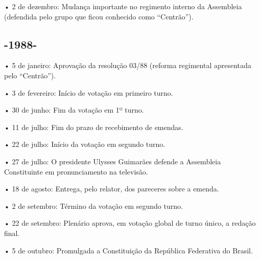 • 2 de dezembro: Mudança importante no regimento interno da Assembleia
(defendida pelo grupo que ficou conhecido como ``Centrão'').

\subsection{-1988-}

\forceindent{}• 5 de janeiro: Aprovação da resolução 03/88 (reforma regimental
apresentada pelo ``Centrão'').

• 3 de fevereiro: Início de votação em primeiro turno.

• 30 de junho: Fim da votação em 1º turno.

• 11 de julho: Fim do prazo de recebimento de emendas.

• 22 de julho: Início da votação em segundo turno.

• 27 de julho: O presidente Ulysses Guimarães defende a Assembleia
Constituinte em pronunciamento na televisão.

• 18 de agosto: Entrega, pelo relator, dos pareceres sobre a emenda.

• 2 de setembro: Término da votação em segundo turno.

• 22 de setembro: Plenário aprova, em votação global de turno único, a
redação final.

• 5 de outubro: Promulgada a Constituição da República Federativa do
Brasil.